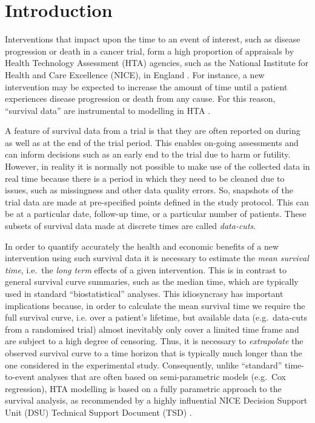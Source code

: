 \documentclass[AMA,STIX1COL]{WileyNJD-v2}
\begin{document}

\maketitle


\section{Introduction}\label{sec:intro}
Interventions that impact upon the time to an event of interest, such as disease progression or death in a cancer trial, form a high proportion of appraisals by Health Technology Assessment (HTA) agencies, such as the National Institute for Health and Care Excellence (NICE), in England \citep{Latimer2011}.
For instance, a new intervention may be expected to increase the amount of time until a patient experiences disease progression or death from any cause. For this reason, ``survival data'' are instrumental to modelling in HTA \cite{Demiris2006, Jackson2010}.

A feature of survival data from a trial is that they are often reported on during as well as at the end of the trial period.
This enables on-going assessments and can inform decisions such as an early end to the trial due to harm or futility.
However, in reality it is normally not possible to make use of the collected data in real time because there is a period in which they need to be cleaned due to issues, such as missingness and other data quality errors.
So, snapshots of the trial data are made at pre-specified points defined in the study protocol.
This can be at a particular date, follow-up time, or a particular number of patients.
These subsets of survival data made at discrete times are called \textit{data-cuts}.

In order to quantify accurately the health and economic benefits of a new intervention using such survival data it is necessary to estimate the {\it mean survival time}, i.e.~the \textit{long term} effects of a given intervention.
This is in contrast to general survival curve summaries, such as the median time, which are typically used in standard ``biostatistical'' analyses.
This idiosyncrasy has important implications because, in order to calculate the mean survival time we require the full survival curve, i.e. over a patient's lifetime, but available data (e.g.~data-cuts from a randomised trial) almost inevitably only cover a limited time frame and are subject to a high degree of censoring.
Thus, it is necessary to \textit{extrapolate} the observed survival curve to a time horizon that is typically much longer than the one considered in the experimental study.
Consequently, unlike ``standard'' time-to-event analyses that are often based on semi-parametric models (e.g.~Cox regression), HTA modelling is based on a fully parametric approach to the survival analysis, as recommended by a highly influential NICE Decision Support Unit (DSU) Technical Support Document (TSD) \citep{Latimer2011}.
\end{document}
